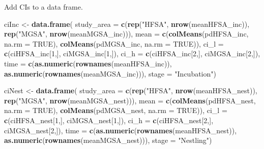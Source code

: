 \documentclass[]{article}
\newenvironment{Shaded}{\begin{snugshade}}{\end{snugshade}}
\newcommand{\DataTypeTok}[1]{\textcolor[rgb]{0.13,0.29,0.53}{#1}}
\newcommand{\DecValTok}[1]{\textcolor[rgb]{0.00,0.00,0.81}{#1}}
\newcommand{\KeywordTok}[1]{\textcolor[rgb]{0.13,0.29,0.53}{\textbf{#1}}}
\newcommand{\NormalTok}[1]{#1}
\newcommand{\OtherTok}[1]{\textcolor[rgb]{0.56,0.35,0.01}{#1}}
\newcommand{\StringTok}[1]{\textcolor[rgb]{0.31,0.60,0.02}{#1}}
\begin{document}
Add CIs to a data frame.

\begin{Shaded}
\begin{Highlighting}[]
\NormalTok{ciInc <-}\StringTok{ }\KeywordTok{data.frame}\NormalTok{(}
    \DataTypeTok{study_area =} \KeywordTok{c}\NormalTok{(}\KeywordTok{rep}\NormalTok{(}\StringTok{"HFSA"}\NormalTok{, }\KeywordTok{nrow}\NormalTok{(meanHFSA_inc)), }\KeywordTok{rep}\NormalTok{(}\StringTok{"MGSA"}\NormalTok{, }\KeywordTok{nrow}\NormalTok{(meanMGSA_inc))),}
    \DataTypeTok{mean =} \KeywordTok{c}\NormalTok{(}\KeywordTok{colMeans}\NormalTok{(pdHFSA_inc, }\DataTypeTok{na.rm =} \OtherTok{TRUE}\NormalTok{), }\KeywordTok{colMeans}\NormalTok{(pdMGSA_inc, }\DataTypeTok{na.rm =} \OtherTok{TRUE}\NormalTok{)),}
    \DataTypeTok{ci_l =} \KeywordTok{c}\NormalTok{(ciHFSA_inc[}\DecValTok{1}\NormalTok{,], ciMGSA_inc[}\DecValTok{1}\NormalTok{,]),}
    \DataTypeTok{ci_h =} \KeywordTok{c}\NormalTok{(ciHFSA_inc[}\DecValTok{2}\NormalTok{,], ciMGSA_inc[}\DecValTok{2}\NormalTok{,]),}
    \DataTypeTok{time =} \KeywordTok{c}\NormalTok{(}\KeywordTok{as.numeric}\NormalTok{(}\KeywordTok{rownames}\NormalTok{(meanHFSA_inc)), }\KeywordTok{as.numeric}\NormalTok{(}\KeywordTok{rownames}\NormalTok{(meanMGSA_inc))),}
    \DataTypeTok{stage =} \StringTok{"Incubation"}\NormalTok{)}


\NormalTok{ciNest <-}\StringTok{ }\KeywordTok{data.frame}\NormalTok{(}
    \DataTypeTok{study_area =} \KeywordTok{c}\NormalTok{(}\KeywordTok{rep}\NormalTok{(}\StringTok{"HFSA"}\NormalTok{, }\KeywordTok{nrow}\NormalTok{(meanHFSA_nest)), }\KeywordTok{rep}\NormalTok{(}\StringTok{"MGSA"}\NormalTok{, }\KeywordTok{nrow}\NormalTok{(meanMGSA_nest))),}
    \DataTypeTok{mean =} \KeywordTok{c}\NormalTok{(}\KeywordTok{colMeans}\NormalTok{(pdHFSA_nest, }\DataTypeTok{na.rm =} \OtherTok{TRUE}\NormalTok{), }\KeywordTok{colMeans}\NormalTok{(pdMGSA_nest, }\DataTypeTok{na.rm =} \OtherTok{TRUE}\NormalTok{)),}
    \DataTypeTok{ci_l =} \KeywordTok{c}\NormalTok{(ciHFSA_nest[}\DecValTok{1}\NormalTok{,], ciMGSA_nest[}\DecValTok{1}\NormalTok{,]),}
    \DataTypeTok{ci_h =} \KeywordTok{c}\NormalTok{(ciHFSA_nest[}\DecValTok{2}\NormalTok{,], ciMGSA_nest[}\DecValTok{2}\NormalTok{,]),}
    \DataTypeTok{time =} \KeywordTok{c}\NormalTok{(}\KeywordTok{as.numeric}\NormalTok{(}\KeywordTok{rownames}\NormalTok{(meanHFSA_nest)), }\KeywordTok{as.numeric}\NormalTok{(}\KeywordTok{rownames}\NormalTok{(meanMGSA_nest))),}
    \DataTypeTok{stage =} \StringTok{"Nestling"}\NormalTok{)}
\end{Highlighting}
\end{Shaded}
\end{document}
